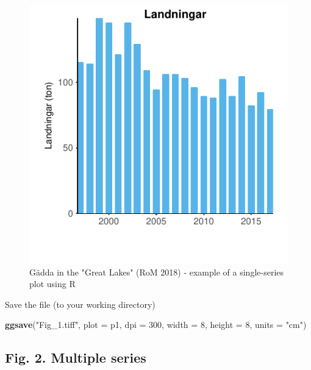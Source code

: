 \documentclass[]{article}
\newenvironment{Shaded}{\begin{snugshade}}{\end{snugshade}}
\newcommand{\KeywordTok}[1]{\textcolor[rgb]{0.13,0.29,0.53}{\textbf{#1}}}
\newcommand{\DataTypeTok}[1]{\textcolor[rgb]{0.13,0.29,0.53}{#1}}
\newcommand{\DecValTok}[1]{\textcolor[rgb]{0.00,0.00,0.81}{#1}}
\newcommand{\StringTok}[1]{\textcolor[rgb]{0.31,0.60,0.02}{#1}}
\newcommand{\NormalTok}[1]{#1}
\begin{document}
\begin{figure}

{\centering \includegraphics{Making_figures_for_RoM_in_R_files/figure-latex/plot 1-1} 

}

\caption{Gädda in the "Great Lakes" (RoM 2018) - example of a single-series plot using R}\label{fig:plot 1}
\end{figure}

Save the file (to your working directory)

\begin{Shaded}
\begin{Highlighting}[]
\KeywordTok{ggsave}\NormalTok{(}\StringTok{"Fig_1.tiff"}\NormalTok{, }\DataTypeTok{plot =}\NormalTok{ p1, }\DataTypeTok{dpi =} \DecValTok{300}\NormalTok{, }\DataTypeTok{width =} \DecValTok{8}\NormalTok{, }\DataTypeTok{height =} \DecValTok{8}\NormalTok{, }\DataTypeTok{units =} \StringTok{"cm"}\NormalTok{)}
\end{Highlighting}
\end{Shaded}

\subsection{Fig. 2. Multiple series}\label{fig.-2.-multiple-series}
\end{document}
